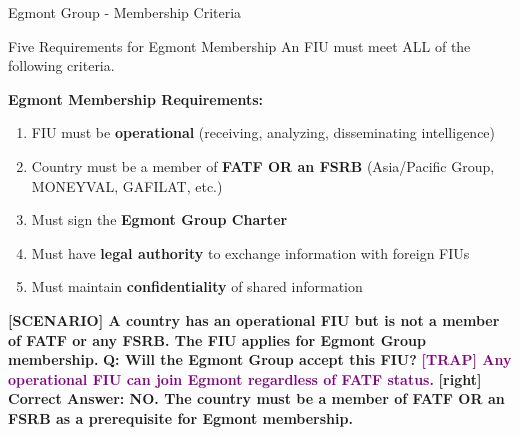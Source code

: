 \documentclass[11pt,a4paper]{beamer}
\newcommand{\trap}[1]{\textcolor{purple}{\textbf{[TRAP] #1}}}
\newcommand{\correct}[1]{\textcolor{green!50!black}{\textbf{[right] #1}}}
\newcommand{\scenario}[1]{\textcolor{blue!70!black}{\textbf{[SCENARIO] #1}}}
\begin{document}
\begin{frame}{Egmont Group - Membership Criteria}
\begin{block}{Five Requirements for Egmont Membership}
An FIU must meet ALL of the following criteria.
\end{block}
\textbf{Egmont Membership Requirements:}
\begin{enumerate}
\item FIU must be \textbf{operational} (receiving, analyzing, disseminating intelligence)
\item Country must be a member of \textbf{FATF OR an FSRB} (Asia/Pacific Group, MONEYVAL, GAFILAT, etc.)
\item Must sign the \textbf{Egmont Group Charter}
\item Must have \textbf{legal authority} to exchange information with foreign FIUs
\item Must maintain \textbf{confidentiality} of shared information
\end{enumerate}
\scenario{A country has an operational FIU but is not a member of FATF or any FSRB. The FIU applies for Egmont Group membership.}
\vspace{0.2cm}
\textbf{Q: Will the Egmont Group accept this FIU?}
\trap{Any operational FIU can join Egmont regardless of FATF status.}
\correct{Correct Answer: NO. The country must be a member of FATF OR an FSRB as a prerequisite for Egmont membership.}
\end{frame}

\end{document}
